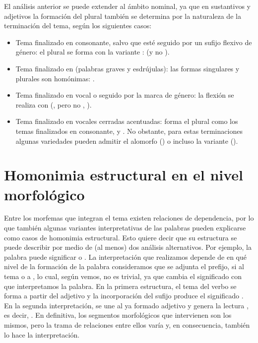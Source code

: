 \begin{recuadro}
El análisis anterior se puede extender al ámbito nominal, ya que en sustantivos
y adjetivos la formación del plural también se determina por la naturaleza de
la terminación del tema, según los siguientes casos:
\begin{itemize}
  \item Tema finalizado en consonante, salvo que esté seguido por un sufijo
        flexivo de género: el plural se forma con la variante :
         (y no ).
  \item Tema finalizado en  (palabras graves y esdrújulas): las formas
        singulares y plurales son homónimas: .
  \item Tema finalizado en vocal o seguido por la marca de género: la flexión se
        realiza con  (, pero no
        , ).
  \item Tema finalizado en vocales cerradas acentuadas: forma el plural como los
        temas finalizados en consonante,  y . No
        obstante, para estas terminaciones algunas variedades pueden admitir el
        alomorfo  () o incluso la variante
         ().
\end{itemize}
\end{recuadro}

\section{Homonimia estructural en el nivel morfológico}\label{sec:04-homonimia}

Entre los morfemas que integran el tema existen relaciones de dependencia, por
lo que también algunas variantes interpretativas de las palabras pueden
explicarse como casos de homonimia estructural. Esto quiere decir que su
estructura se puede describir por medio de (al menos) dos análisis
alternativos. Por ejemplo, la palabra  puede
significar  o . La
interpretación que realizamos depende de en qué nivel de la formación de la
palabra consideramos que se adjunta el prefijo, si al tema  o a
, lo cual, según vemos, no es trivial, ya que cambia el
significado con que interpretamos la palabra. En la primera estructura, el tema
del verbo  se forma a partir del adjetivo  y la
incorporación del sufijo  produce el significado . En la segunda interpretación,  se une al ya formado
adjetivo  y genera la lectura , es decir,
. En definitiva, los segmentos morfológicos que
intervienen son los mismos, pero la trama de relaciones entre ellos varía y, en
consecuencia, también lo hace la interpretación.

